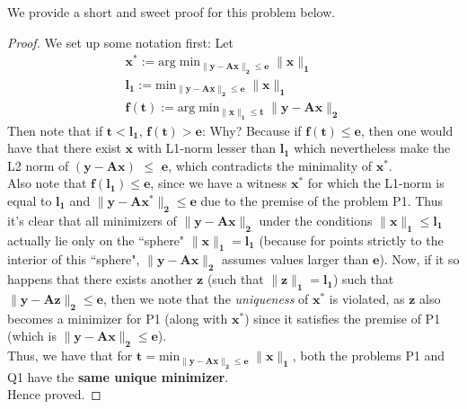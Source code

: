 \documentclass[a4paper,11pt]{article}
\numberwithin{definition}{section}
\numberwithin{mytheorem}{subsection}
\begin{document}
We provide a short and sweet proof for this problem below.
\begin{proof}
We set up some notation first: Let 
\begin{gather*}
    \boldsymbol{x^*} :=  \mathrm{arg\;min}\boldsymbol{_{\lVert y - Ax\rVert_2 \leq e}\;\lVert x\rVert_1} \\
    \boldsymbol{l_1 := } \mathrm{min}\boldsymbol{_{\lVert y - Ax\rVert_2 \leq e}\;\lVert x\rVert_1} \\
    \boldsymbol{f(t) := } \mathrm{arg\;min}\boldsymbol{_{\lVert x\rVert_1 \leq t}\; \lVert y - Ax\rVert_2} 
\end{gather*}
Then note that if $\boldsymbol{t < l_1}$, $\boldsymbol{f(t) > e}$: Why? Because if $\boldsymbol{f(t) \leq e}$, then one would have that there exist $\boldsymbol{x}$ with L1-norm lesser than $\boldsymbol{l_1}$ which nevertheless make the L2 norm of $\boldsymbol{(y - Ax)}$ $\leq$ $\boldsymbol{e}$, which contradicts the minimality of $\boldsymbol{x^*}$.\\
Also note that $\boldsymbol{f(l_1) \leq e}$, since we have a witness $\boldsymbol{x^*}$ for which the L1-norm is equal to $\boldsymbol{l_1}$ and $\boldsymbol{\lVert y - Ax^*\rVert_2 \leq e}$ due to the premise of the problem P1. Thus it's clear that all minimizers of $\boldsymbol{\lVert y - Ax\rVert_2}$ under the conditions $\boldsymbol{\lVert x\rVert_1 \leq l_1}$ actually lie only on the ``sphere" $\boldsymbol{\lVert x\rVert_1 = l_1}$ (because for points strictly to the interior of this ``sphere", $\boldsymbol{\lVert y - Ax\rVert_2}$ assumes values larger than $\boldsymbol{e}$). Now, if it so happens that there exists another $\boldsymbol{z}$ (such that $\boldsymbol{\lVert z\rVert_1 = l_1}$) such that $\boldsymbol{\lVert y - Az\rVert_2 \leq e}$, then we note that the \emph{uniqueness} of $\boldsymbol{x^*}$ is violated, as $\boldsymbol{z}$ also becomes a minimizer for P1 (along with $\boldsymbol{x^*}$) since it satisfies the premise of P1 (which is $\boldsymbol{\lVert y - Ax\rVert_2 \leq e}$).\\
Thus, we have that for $\boldsymbol{t = \mathrm{min}_{\lVert y - Ax\rVert_2 \leq e}\;\lVert x\rVert_1}$, both the problems P1 and Q1 have the \textbf{same unique minimizer}.\\
Hence proved.
\end{proof}

\newpage
\end{document}
